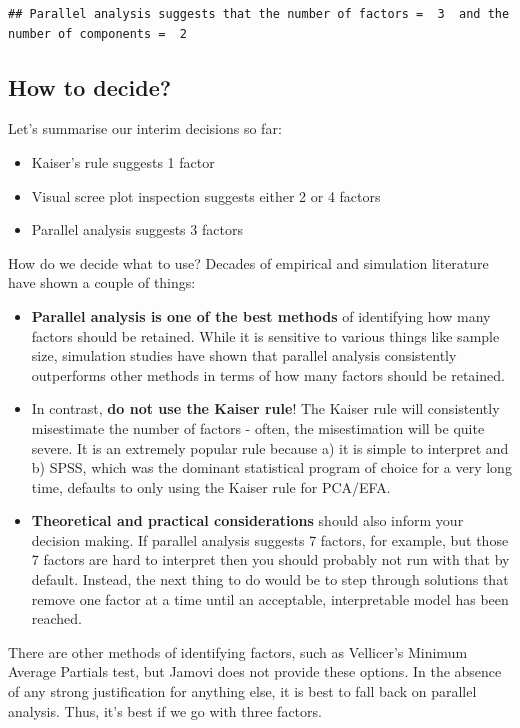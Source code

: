 \documentclass[
]{book}
\providecommand{\tightlist}{%
  \setlength{\itemsep}{0pt}\setlength{\parskip}{0pt}}
\begin{document}
\begin{verbatim}
## Parallel analysis suggests that the number of factors =  3  and the number of components =  2
\end{verbatim}

\hypertarget{how-to-decide}{%
\subsection{How to decide?}\label{how-to-decide}}

Let's summarise our interim decisions so far:

\begin{itemize}
\tightlist
\item
  Kaiser's rule suggests 1 factor
\item
  Visual scree plot inspection suggests either 2 or 4 factors
\item
  Parallel analysis suggests 3 factors
\end{itemize}

How do we decide what to use? Decades of empirical and simulation literature have shown a couple of things:

\begin{itemize}
\tightlist
\item
  \textbf{Parallel analysis is one of the best methods} of identifying how many factors should be retained. While it is sensitive to various things like sample size, simulation studies have shown that parallel analysis consistently outperforms other methods in terms of how many factors should be retained.
\item
  In contrast, \textbf{do not use the Kaiser rule}! The Kaiser rule will consistently misestimate the number of factors - often, the misestimation will be quite severe. It is an extremely popular rule because a) it is simple to interpret and b) SPSS, which was the dominant statistical program of choice for a very long time, defaults to only using the Kaiser rule for PCA/EFA.
\item
  \textbf{Theoretical and practical considerations} should also inform your decision making. If parallel analysis suggests 7 factors, for example, but those 7 factors are hard to interpret then you should probably not run with that by default. Instead, the next thing to do would be to step through solutions that remove one factor at a time until an acceptable, interpretable model has been reached.
\end{itemize}

There are other methods of identifying factors, such as Vellicer's Minimum Average Partials test, but Jamovi does not provide these options. In the absence of any strong justification for anything else, it is best to fall back on parallel analysis. Thus, it's best if we go with three factors.
\end{document}
